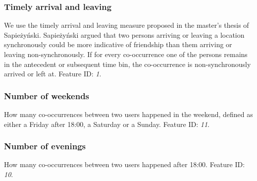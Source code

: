 \subsubsection{Timely arrival and leaving}
We use the timely arrival and leaving measure proposed in the master's thesis of Sapieżyński\cite{IMM2013-06556}.
Sapieżyński argued that two persons arriving or leaving a location synchronously could be more indicative of friendship than them arriving or leaving non-synchronously. If for every co-occurrence one of the persons remains in the antecedent or subsequent time bin, the co-occurrence is non-synchronously arrived or left at.
Feature ID: \textit{1}.

\subsubsection{Number of weekends}
How many co-occurrences between two users happened in the weekend, defined as either a Friday after 18:00, a Saturday or a Sunday.
Feature ID: \textit{11}.

\subsubsection{Number of evenings}
How many co-occurrences between two users happened after 18:00.
Feature ID: \textit{10}.


